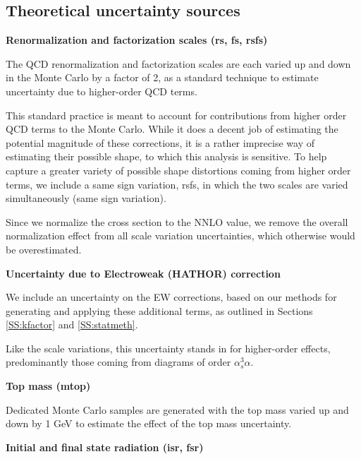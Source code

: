 \subsection{Theoretical uncertainty sources}

\noindent \textbf{Renormalization and factorization scales (rs, fs, rsfs)}

The QCD renormalization and factorization scales are each varied up and down in the Monte Carlo by a factor of 2, as a standard technique to estimate uncertainty due to higher-order QCD terms.

This standard practice is meant to account for contributions from higher order QCD terms to the Monte Carlo. While it does a decent job of estimating the potential magnitude of these corrections, it is a rather imprecise way of estimating their possible shape, to which this analysis is sensitive. To help capture a greater variety of possible shape distortions coming from higher order terms, we include a same sign variation, rsfs, in which the two scales are varied simultaneously (same sign variation).

Since we normalize the cross section to the NNLO value, we remove the overall normalization effect from all scale variation uncertainties, which otherwise would be overestimated. 

\par \noindent
\textbf{Uncertainty due to Electroweak (HATHOR) correction} 

We include an uncertainty on the EW corrections, based on our methods for generating and applying these additional terms, as outlined in Sections \ref{SS:kfactor} and \ref{SS:statmeth}.

Like the scale variations, this uncertainty stands in for higher-order effects, predominantly those coming from diagrams of order $\alpha_s^3 \alpha$. 
\par \noindent
\textbf{Top mass (mtop)}

Dedicated Monte Carlo samples are generated with the top mass varied up and down by 1 \unit{GeV} to estimate the effect of the top mass uncertainty. 
\par \noindent
\textbf{Initial and final state radiation (isr, fsr)}

